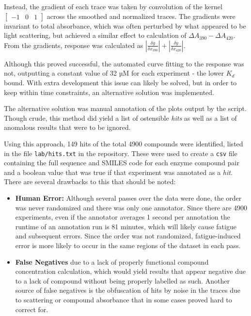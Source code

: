 \documentclass{article}
\begin{document}
Instead, the gradient of each trace was taken by convolution of the kernel $\begin{bmatrix} -1 & 0 & 1 \end{bmatrix}$ across the smoothed and normalized traces.
The gradients were invariant to total absorbance, which was often perturbed by what appeared to be light scattering, but achieved a similar effect to calculation of $\Delta A_{390} - \Delta A_{420}$.
From the gradients, response was calculated as $|{\frac{\delta y}{\delta x_{390}}}| + |{\frac{\delta y}{\delta x_{420}}}|$.

Although this proved successful, the automated curve fitting to the response was not, outputting a constant value of 32 µM for each experiment - the lower $K_d$ bound.
With extra development this issue can likely be solved, but in order to keep within time constraints, an alternative solution was implemented.


The alternative solution was manual annotation of the plots output by the script.
Though crude, this method did yield a list of ostensible \textit{hits} as well as a list of anomalous results that were to be ignored.

Using this approach, 149 hits of the total 4900 compounds were identified, listed in the file \texttt{lab/hits.txt} in the repository.
These were used to create a \texttt{csv} file containing the full sequence and SMILES code for each enzyme compound pair and a boolean value that was true if that experiment was annotated as a \textit{hit}.
There are several drawbacks to this that should be noted:

\begin{itemize}
	\item \textbf{Human Error:} Although several passes over the data were done, the order was never randomized and there was only one annotator. 
		Since there are 4900 experiments, even if the annotator averages 1 second per annotation the runtime of an annotation run is 81 minutes, which will likely cause fatigue and subsequent errors.
		Since the order was not randomized, fatigue-induced error is more likely to occur in the same regions of the dataset in each pass.
	\item \textbf{False Negatives} due to a lack of properly functional compound concentration calculation, which would yield results that appear negative due to a lack of compound without being properly labelled as such.
		Another source of false negatives is the obfuscation of hits by noise in the traces due to scattering or compound absorbance that in some cases proved hard to correct for.
\end{itemize}
\end{document}
